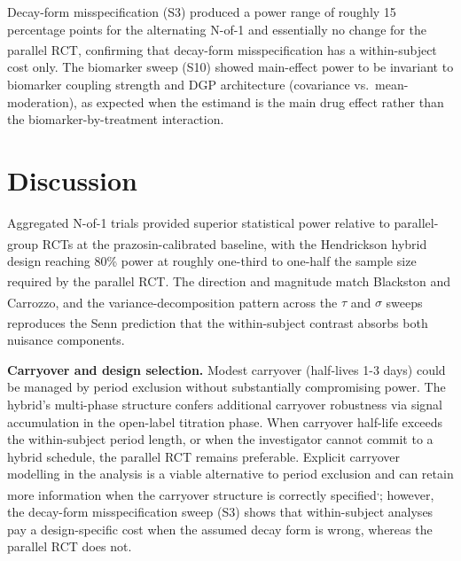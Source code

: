 \documentclass[
  11pt,
]{article}
\begin{document}
Decay-form misspecification (S3) produced a power range of roughly 15
percentage points for the alternating N-of-1 and essentially no change
for the parallel
RCT\textsuperscript{},
confirming that decay-form misspecification has a within-subject cost
only. The biomarker sweep (S10) showed main-effect power to be invariant
to biomarker coupling strength and DGP architecture (covariance
vs.~mean-moderation), as expected when the estimand is the main drug
effect rather than the biomarker-by-treatment interaction.

\section{Discussion}\label{discussion}

Aggregated N-of-1 trials provided superior statistical power relative to
parallel-group RCTs at the prazosin-calibrated baseline, with the
Hendrickson\textsuperscript{}
hybrid design reaching 80\% power at roughly one-third to one-half the
sample size required by the parallel RCT. The direction and magnitude
match
Blackston\textsuperscript{}
and Carrozzo\textsuperscript{}, and
the variance-decomposition pattern across the \(\tau\) and \(\sigma\)
sweeps reproduces the
Senn\textsuperscript{}
prediction that the within-subject contrast absorbs both nuisance
components.

\textbf{Carryover and design selection.} Modest carryover (half-lives
1-3 days) could be managed by period exclusion without substantially
compromising power. The hybrid's multi-phase structure confers
additional carryover robustness via signal accumulation in the
open-label titration phase. When carryover half-life exceeds the
within-subject period length, or when the investigator cannot commit to
a hybrid schedule, the parallel RCT remains preferable. Explicit
carryover modelling in the analysis is a viable alternative to period
exclusion and can retain more information when the carryover structure
is correctly
specified\textsuperscript{,};
however, the decay-form misspecification sweep (S3) shows that
within-subject analyses pay a design-specific cost when the assumed
decay form is wrong, whereas the parallel RCT does not.
\end{document}
